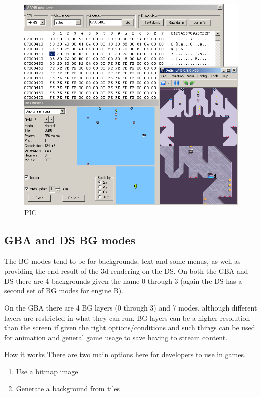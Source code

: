 \documentclass[
]{book}
\providecommand{\tightlist}{%
  \setlength{\itemsep}{0pt}\setlength{\parskip}{0pt}}
\begin{document}
\begin{figure}
\centering
\includegraphics{images/34_home_fast6191_romhackingguide_unrenamed_file___ginal_borders_romhackingguide2dOAMdesmume_2.png}
\caption{PIC}
\end{figure}

\hypertarget{gba-and-ds-bg-modes}{%
\subsection{GBA and DS BG modes}\label{gba-and-ds-bg-modes}}

The BG modes tend to be for backgrounds, text and some menus, as well as providing the end result of the 3d rendering on the DS. On both the GBA and DS there are 4 backgrounds given the name 0 through 3 (again the DS has a second set of BG modes for engine B).

On the GBA there are 4 BG layers (0 through 3) and 7 modes, although different layers are restricted in what they can run. BG layers can be a higher resolution than the screen if given the right options/conditions and such things can be used for animation and general game usage to save having to stream content.

How it works There are two main options here for developers to use in games.

\begin{enumerate}
\def\labelenumi{\arabic{enumi}.}
\tightlist
\item
  Use a bitmap image
\item
  Generate a background from tiles
\end{enumerate}
\end{document}

